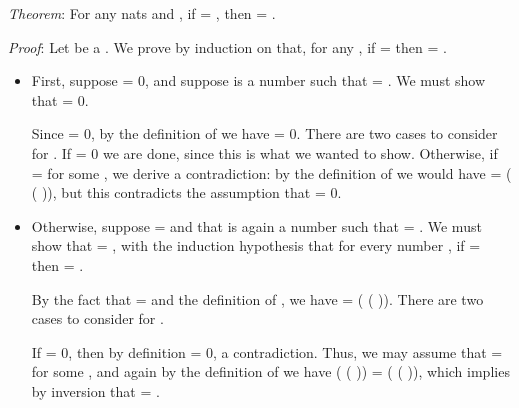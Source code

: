 \documentclass[12pt]{report}
\begin{document}
\textit{Theorem}: For any nats  and , if   =  , then
   = .


\textit{Proof}: Let  be a . We prove by induction on  that, for
  any , if   =   then  = .



\begin{itemize}
\item  First, suppose  = 0, and suppose  is a number such
    that   =  .  We must show that  = 0.


    Since  = 0, by the definition of  we have   =
    0.  There are two cases to consider for .  If  = 0 we are
    done, since this is what we wanted to show.  Otherwise, if  = 
     for some , we derive a contradiction: by the definition of
     we would have   =  ( ( )), but this
    contradicts the assumption that   = 0.



\item  Otherwise, suppose  =   and that  is again a number such
    that   =  .  We must show that  =  , with
    the induction hypothesis that for every number , if   =
      then  = .


    By the fact that  =   and the definition of , we
    have   =  ( ( )).  There are two cases to
    consider for .


    If  = 0, then by definition   = 0, a contradiction.
    Thus, we may assume that  =   for some , and again by
    the definition of  we have  ( ( )) =  (
    ( )), which implies by inversion that   = 
    .



\end{itemize}
\end{document}

